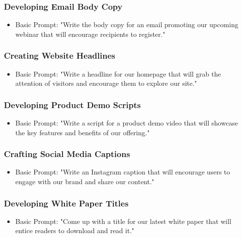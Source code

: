 \begin{frame}[fragile]\frametitle{Developing Email Body Copy}
\begin{itemize}
\item Basic Prompt: "Write the body copy for an email promoting our upcoming webinar that will encourage recipients to register."
\end{itemize}
\end{frame}

\begin{frame}[fragile]\frametitle{Creating Website Headlines}
\begin{itemize}
\item Basic Prompt: "Write a headline for our homepage that will grab the attention of visitors and encourage them to explore our site."
\end{itemize}
\end{frame}

\begin{frame}[fragile]\frametitle{Developing Product Demo Scripts}
\begin{itemize}
\item Basic Prompt: "Write a script for a product demo video that will showcase the key features and benefits of our offering."
\end{itemize}
\end{frame}

\begin{frame}[fragile]\frametitle{Crafting Social Media Captions}
\begin{itemize}
\item Basic Prompt: "Write an Instagram caption that will encourage users to engage with our brand and share our content."
\end{itemize}
\end{frame}

\begin{frame}[fragile]\frametitle{Developing White Paper Titles}
\begin{itemize}
\item Basic Prompt: "Come up with a title for our latest white paper that will entice readers to download and read it."
\end{itemize}
\end{frame}

